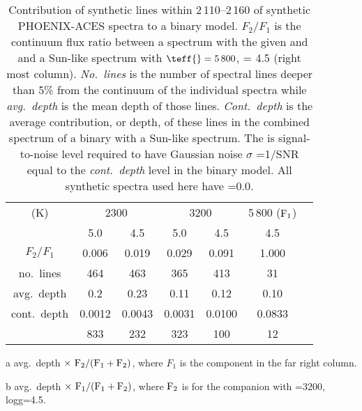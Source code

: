 
\begin{table}
    \small
    \centering
    \begin{threeparttable}[b]
        \caption{Contribution of synthetic lines within 2\,110--2\,160\nm{} of synthetic {PHOENIX-ACES} spectra to a binary model. \(F_{2}/F_{1}\) is the continuum flux ratio between a spectrum with the given \txteff{} and \logg{} and a Sun-like spectrum with \(\teff{}=5\,800\),\logg{} = 4.5 (right most column). \emph{No.\ lines} is the number of spectral lines deeper than 5\% from the continuum of the individual spectra while \emph{avg.\ depth} is the mean depth of those lines. \emph{Cont.\ depth} is the average contribution, or depth, of these lines in the combined spectrum of a binary with a Sun-like spectrum. The \snr{} is signal-to-noise level required to have Gaussian noise \(\sigma\) =1/{SNR} equal to the \emph{cont.\ depth} level in the binary model. All synthetic spectra used here have \feh{}=0.0.}
        \begin{tabular}{*7c}
            \toprule
            \teff{} (K)  & \multicolumn{2}{c}{2300} & \multicolumn{2}{c}{3200} & 5\,800 (\(\rm F_1\))\\
           \logg{} & 5.0 & 4.5  & 5.0 & 4.5 & 4.5 \\
            \midrule
            \(F_2/F_1\) & 0.006 & 0.019 & 0.029  & 0.091 & 1.000 \\
            no.\ lines & 464 & 463 & 365  & 413 & 31 \\
            avg.\ depth & 0.2  & 0.23& 0.11 & 0.12 & 0.10 \\
            cont.\ depth\tnote{a} &  0.0012 & 0.0043 &  0.0031 & 0.0100&  0.0833\tnote{b} \\
            \snr{}  & 833 & 232 & 323  & 100 & 12 \\
            \bottomrule
        \end{tabular}\label{tab:line_contributions}
        \begin{tablenotes}
            \item [a] avg.\ depth \(\times~ \rm F_2 / (F_1 + F_2)\), where \(F_1\) is the component in the far right column.
            \item[b] avg.\ depth \(\times~ \rm F_1 / (F_1 + F_2)\), where \(\rm F_2\) is for the companion with \teff{}=3200, logg=4.5.
        \end{tablenotes}
    \end{threeparttable}
\end{table}
